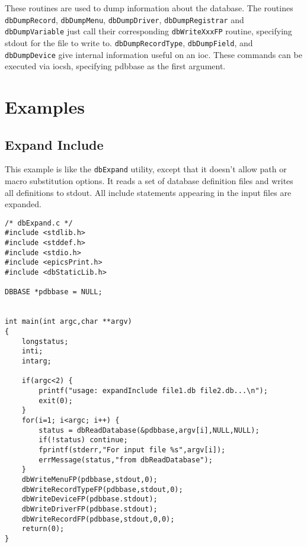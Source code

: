 These routines are used to dump information about the database.
The routines \verb|dbDumpRecord|, \verb|dbDumpMenu|, \verb|dbDumpDriver|, \verb|dbDumpRegistrar| and \verb|dbDumpVariable| just call their corresponding \verb|dbWriteXxxFP| routine, specifying stdout for the file to write to.
\verb|dbDumpRecordType|, \verb|dbDumpField|, and \verb|dbDumpDevice| give internal information useful on an ioc.
These commands can be executed via iocsh, specifying pdbbase as the first argument.

\section{Examples}

\subsection{Expand Include}

This example is like the \verb|dbExpand| utility, except that it doesn't allow path or macro substitution options.
It reads a set of database definition files and writes all definitions to stdout.
All include statements appearing in the input files are expanded.

\begin{verbatim}
/* dbExpand.c */
#include <stdlib.h>
#include <stddef.h>
#include <stdio.h>
#include <epicsPrint.h>
#include <dbStaticLib.h>

DBBASE *pdbbase = NULL;


int main(int argc,char **argv)
{
    longstatus;
    inti;
    intarg;
 
    if(argc<2) {
        printf("usage: expandInclude file1.db file2.db...\n");
        exit(0);
    }
    for(i=1; i<argc; i++) {
        status = dbReadDatabase(&pdbbase,argv[i],NULL,NULL);
        if(!status) continue;
        fprintf(stderr,"For input file %s",argv[i]);
        errMessage(status,"from dbReadDatabase");
    }
    dbWriteMenuFP(pdbbase,stdout,0);
    dbWriteRecordTypeFP(pdbbase,stdout,0);
    dbWriteDeviceFP(pdbbase.stdout);
    dbWriteDriverFP(pdbbase.stdout);
    dbWriteRecordFP(pdbbase,stdout,0,0);
    return(0);
}

\end{verbatim}

